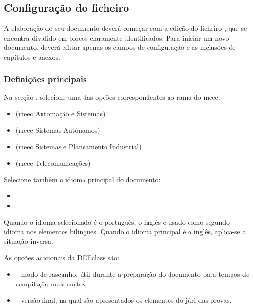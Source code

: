 
\subsection{Configuração do ficheiro }
\label{subsec:Ch2.2.3}

A elaboração do seu documento deverá começar com a edição do ficheiro , que se encontra dividido em blocos claramente identificados. Para iniciar um novo documento, deverá editar apenas os campos de configuração e as inclusões de capítulos e anexos.

\subsubsection*{Definições principais}

Na secção , selecione uma das opções correspondentes ao ramo do \ac{meec}:

\begin{itemize}
\item {} (\acs{meec} Automação e Sistemas)
\item {} (\acs{meec} Sistemas Autónomos)
\item {} (\acs{meec} Sistemas e Planeamento Industrial)
\item {} (\acs{meec} Telecomunicações)
\end{itemize}

Selecione também o idioma principal do documento: 
\begin{itemize}
\item {} 
\item {}
\end{itemize}

Quando o idioma selecionado é o português, o inglês é usado como segundo idioma nos elementos bilingues. Quando o idioma principal é o inglês, aplica-se a situação inversa.

As opções adicionais da DEEclass são:

\begin{itemize}
    \item {} -- modo de rascunho, útil durante a preparação do documento para tempos de compilação mais curtos;
    \item {} -- versão final, na qual são apresentados os elementos do júri das provas.
\end{itemize}

